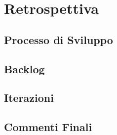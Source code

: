 \chapter{Retrospettiva}
\section{Processo di Sviluppo}
\section{Backlog}
\section{Iterazioni}
\section{Commenti Finali}